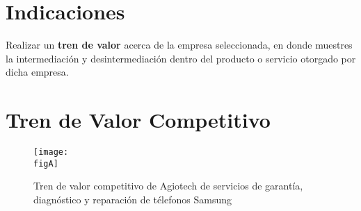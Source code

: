 


	\clearpage
	\vspace*{-16pt}
	\begin{center}
		{\textbf{\huge \theTitle}}
	\end{center}
	\vspace*{8pt}


	\section{Indicaciones}

	Realizar un \textbf{tren de valor} acerca de la empresa seleccionada, en donde muestres la intermediación y desintermediación dentro del producto o servicio otorgado por dicha empresa.

	\section{Tren de Valor Competitivo}

	\begin{figure}[h]
		\centering
		\texttt{[image: \\figA]}
		\caption{Tren de valor competitivo de Agiotech de servicios de garantía, diagnóstico y reparación de télefonos Samsung}
	\end{figure}

